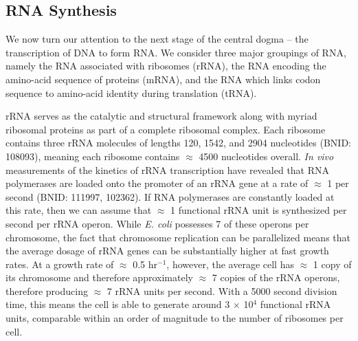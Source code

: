 \subsection{RNA Synthesis}\label{sec:RNA_synthesis}
We
now turn our attention to the next stage of the central dogma -- the
transcription of DNA to form RNA. We consider three major groupings
of RNA, namely the RNA associated with ribosomes (rRNA), the RNA encoding the
amino-acid sequence of proteins (mRNA), and the RNA which links codon
sequence to amino-acid identity during translation (tRNA).

rRNA serves as the catalytic and structural
framework along with myriad ribosomal proteins as part of a complete ribosomal complex.
Each ribosome contains three rRNA molecules of lengths 120, 1542,
and 2904 nucleotides (BNID: 108093), meaning each ribosome
contains $\approx$ 4500 nucleotides overall.
\textit{In vivo} measurements of the kinetics of rRNA transcription have revealed that
RNA polymerases are loaded onto the promoter of an rRNA gene at a rate of
$\approx$ 1 per second (BNID: 111997, 102362). If RNA
polymerases are constantly loaded at this rate,
then we can assume that $\approx$ 1 functional rRNA unit is
synthesized per second per rRNA operon. While \textit{E. coli} possesses 7
of these operons per chromosome,
the fact that chromosome
replication can be parallelized means that the average dosage of rRNA genes can
be substantially higher at fast growth rates.
At a growth
rate of $\approx$ 0.5 hr$^{-1}$, however, the average cell has $\approx$ 1 copy of its
chromosome and therefore approximately $\approx$ 7 copies of the rRNA operons,
therefore producing $\approx$ 7 rRNA units per second.
With a 5000 second division time, this means the cell is able to generate around
3 $\times$ 10$^4$ functional rRNA units, comparable within an order of magnitude
to the number of ribosomes per cell.


